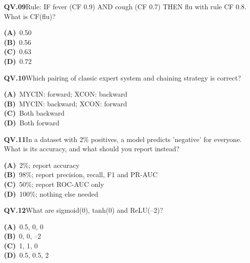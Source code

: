 \documentclass[11pt]{article}
\begin{document}
\begin{tcolorbox}[enhanced,breakable,colback=white,colframe=navyL,arc=2mm,boxrule=0.7pt,left=3mm,right=3mm,top=2mm,bottom=2mm]
\textbf{\color{navy}QV.09}\quad Rule: IF fever (CF 0.9) AND cough (CF 0.7) THEN flu with rule CF 0.8. What is CF(flu)?\hfill{}\par\smallskip
{\small \textbf{\color{navyL}(A)}\ 0.50\\[1pt]\textbf{\color{navyL}(B)}\ 0.56\\[1pt]\textbf{\color{navyL}(C)}\ 0.63\\[1pt]\textbf{\color{navyL}(D)}\ 0.72}
\end{tcolorbox}
\begin{tcolorbox}[enhanced,breakable,colback=white,colframe=navyL,arc=2mm,boxrule=0.7pt,left=3mm,right=3mm,top=2mm,bottom=2mm]
\textbf{\color{navy}QV.10}\quad Which pairing of classic expert system and chaining strategy is correct?\hfill{}\par\smallskip
{\small \textbf{\color{navyL}(A)}\ MYCIN: forward; XCON: backward\\[1pt]\textbf{\color{navyL}(B)}\ MYCIN: backward; XCON: forward\\[1pt]\textbf{\color{navyL}(C)}\ Both backward\\[1pt]\textbf{\color{navyL}(D)}\ Both forward}
\end{tcolorbox}
\begin{tcolorbox}[enhanced,breakable,colback=white,colframe=navyL,arc=2mm,boxrule=0.7pt,left=3mm,right=3mm,top=2mm,bottom=2mm]
\textbf{\color{navy}QV.11}\quad In a dataset with 2\% positives, a model predicts 'negative' for everyone. What is its accuracy, and what should you report instead?\hfill{}\par\smallskip
{\small \textbf{\color{navyL}(A)}\ 2\%; report accuracy\\[1pt]\textbf{\color{navyL}(B)}\ 98\%; report precision, recall, F1 and PR-AUC\\[1pt]\textbf{\color{navyL}(C)}\ 50\%; report ROC-AUC only\\[1pt]\textbf{\color{navyL}(D)}\ 100\%; nothing else needed}
\end{tcolorbox}
\begin{tcolorbox}[enhanced,breakable,colback=white,colframe=navyL,arc=2mm,boxrule=0.7pt,left=3mm,right=3mm,top=2mm,bottom=2mm]
\textbf{\color{navy}QV.12}\quad What are sigmoid(0), tanh(0) and ReLU(--2)?\hfill{}\par\smallskip
{\small \textbf{\color{navyL}(A)}\ 0.5, 0, 0\\[1pt]\textbf{\color{navyL}(B)}\ 0, 0, --2\\[1pt]\textbf{\color{navyL}(C)}\ 1, 1, 0\\[1pt]\textbf{\color{navyL}(D)}\ 0.5, 0.5, 2}
\end{tcolorbox}
\end{document}

